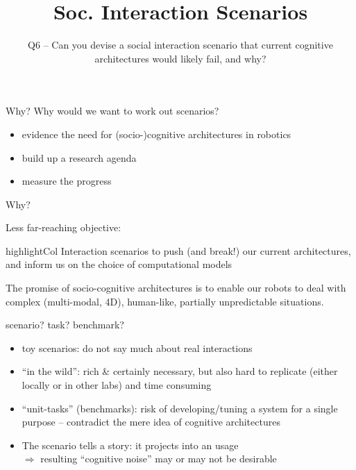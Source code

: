 \documentclass[compress]{beamer}
\title{Soc. Interaction Scenarios}
\subtitle{Q6 -- Can you devise a social interaction scenario that current
cognitive architectures would likely fail, and why?}
\date{}
\author{}
\institute{\texttt{[image: plymouth-logo]}}
\newcommand{\highlight}[1]{%
    \begin{beamercolorbox}[wd=\linewidth,dp=0.7ex]{highlightCol}%
    #1%
    \end{beamercolorbox}%
}%
\begin{document}
\maketitle

\begin{frame}{Why?}
    Why would we want to work out scenarios?

    \begin{itemize}
        \item {\Medium evidence the need} for (socio-)cognitive architectures in
            robotics
        \item {\Medium build up a research agenda}
        \item {\Medium measure the progress}
    \end{itemize}


\end{frame}

\begin{frame}{Why?}

    Less far-reaching objective:
    \vspace{1em}

    \highlight{\centering Interaction scenarios to {\Medium push (and break!)
        our current architectures}, and {\Medium inform} us on the choice of computational models}

\end{frame}

\begin{frame}{}

    The promise of socio-cognitive architectures is to enable our
    robots to {\Medium deal with complex (multi-modal, 4D), human-like, partially unpredictable
    situations}.
    
    \vspace{2em}


\end{frame}


\begin{frame}{}

{\Medium scenario? task? benchmark?}

\begin{itemize}
    \item<2-> {\Medium toy scenarios}: do not say much about real interactions
    \item<3-> {\Medium ``in the wild''}: rich \& certainly necessary, but also hard to replicate (either
        locally or in other labs) and time consuming
    \item<4-> {\Medium ``unit-tasks''} (benchmarks): risk of developing/tuning a system for
        a single purpose -- contradict the mere idea of cognitive architectures
    \item<5-> The scenario {\Medium tells a story}: it projects into an
        usage\\ $\Rightarrow$ resulting ``cognitive noise'' may or may not be desirable
\end{itemize}
\end{frame}
\end{document}
